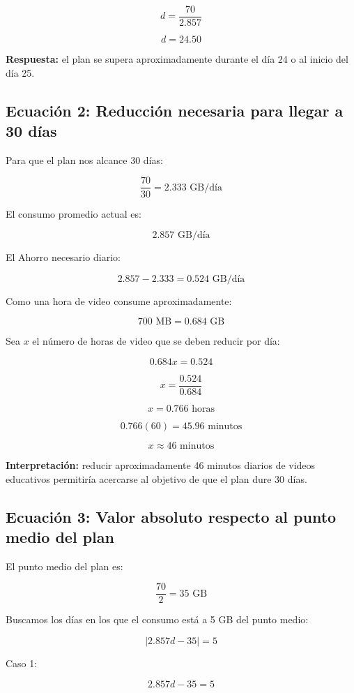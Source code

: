 \documentclass[12pt,a4paper]{article}
\begin{document}
\begin{center}
		\[
		d=\frac{70}{2.857}
		\]
		
		\[
		d=24.50
		\]
		
		\textbf{Respuesta:} el plan se supera aproximadamente durante el día 24 o al inicio del día 25.
		
		\subsection{Ecuación 2: Reducción necesaria para llegar a 30 días}
		
		Para que el plan nos alcance 30 días:
		
		\[
		\frac{70}{30}=2.333\text{ GB/día}
		\]
		
		El consumo promedio actual es:
		
		\[
		2.857\text{ GB/día}
		\]
		
		El Ahorro necesario diario:
		
		\[
		2.857-2.333=0.524\text{ GB/día}
		\]
		
		Como una hora de video consume aproximadamente:
		
		\[
		700\text{ MB}=0.684\text{ GB}
		\]
		
		Sea $x$ el número de horas de video que se deben reducir por día:
		
		\[
		0.684x=0.524
		\]
		
		\[
		x=\frac{0.524}{0.684}
		\]
		
		\[
		x=0.766\text{ horas}
		\]
		
		\[
		0.766(60)=45.96\text{ minutos}
		\]
		
		\[
		\boxed{x\approx46\text{ minutos}}
		\]
		
		\textbf{Interpretación:} reducir aproximadamente 46 minutos diarios de videos educativos permitiría acercarse al objetivo de que el plan dure 30 días.
		
		\subsection{Ecuación 3: Valor absoluto respecto al punto medio del plan}
		
		El punto medio del plan es:
		
		\[
		\frac{70}{2}=35\text{ GB}
		\]
		
		Buscamos los días en los que el consumo está a 5 GB del punto medio:
		
		\[
		|2.857d-35|=5
		\]
		
		Caso 1:
		
		\[
		2.857d-35=5
		\]
		

\end{center}
\end{document}
